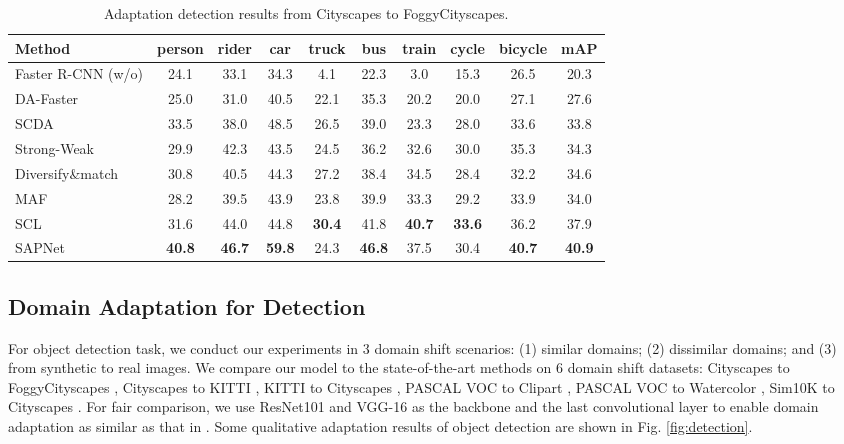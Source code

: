 \documentclass[runningheads]{llncs}
\begin{document}
\begin{table*}[t]
\centering
\caption{Adaptation detection results from Cityscapes to FoggyCityscapes.}
\setlength{\tabcolsep}{2.5pt}
\begin{tabular}{l|cccccccc|c}
\hline
Method  &person &rider &car &truck &bus &train &cycle &bicycle &mAP \\
\hline
Faster R-CNN (w/o)     & 24.1& 33.1& 34.3& 4.1 & 22.3& 3.0 & 15.3& 26.5&  20.3 \\
DA-Faster \cite{DBLP:conf/cvpr/Chen0SDG18}& 25.0& 31.0& 40.5& 22.1& 35.3& 20.2& 20.0& 27.1&  27.6 \\
SCDA \cite{DBLP:conf/cvpr/ZhuPYSL19}&33.5 & 38.0 & 48.5 &26.5 &39.0 &23.3 &28.0 &33.6 &33.8 \\
Strong-Weak \cite{DBLP:conf/cvpr/SaitoUHS19} & 29.9& 42.3& 43.5& 24.5& 36.2& 32.6& 30.0& 35.3&  34.3 \\
Diversify\&match \cite{DBLP:conf/cvpr/KimJKCK19}& 30.8& 40.5& 44.3& 27.2& 38.4& 34.5& 28.4& 32.2&  34.6 \\
MAF \cite{DBLP:journals/corr/abs-1907-10343}         & 28.2& 39.5& 43.9& 23.8& 39.9& 33.3& 29.2& 33.9& 34.0\\
SCL \cite{DBLP:journals/corr/abs-1911-02559}         & 31.6& 44.0& 44.8& {\bf 30.4}& 41.8& {\bf 40.7}& {\bf 33.6}& 36.2&  37.9 \\
\hline
SAPNet                          &{\bf 40.8} &{\bf 46.7} &{\bf 59.8} &24.3 &{\bf 46.8} &37.5 &30.4 &{\bf 40.7} &{\bf 40.9} \\
\hline
\end{tabular}
\label{tab:city2foggy}
\end{table*}

\subsection{Domain Adaptation for Detection}
For object detection task, we conduct our experiments in $3$ domain shift scenarios: (1) similar domains; (2) dissimilar domains; and (3) from synthetic to real images. We compare our model to the state-of-the-art methods on $6$ domain shift datasets: Cityscapes \cite{DBLP:conf/cvpr/CordtsORREBFRS16} to FoggyCityscapes \cite{DBLP:journals/ijcv/SakaridisDG18}, Cityscapes \cite{DBLP:conf/cvpr/CordtsORREBFRS16} to KITTI \cite{DBLP:conf/cvpr/GeigerLU12}, KITTI \cite{DBLP:conf/cvpr/GeigerLU12} to Cityscapes \cite{DBLP:conf/cvpr/CordtsORREBFRS16}, PASCAL VOC \cite{DBLP:journals/ijcv/EveringhamGWWZ10} to Clipart \cite{DBLP:conf/cvpr/InoueFYA18}, PASCAL VOC \cite{DBLP:journals/ijcv/EveringhamGWWZ10} to Watercolor \cite{DBLP:conf/cvpr/InoueFYA18}, Sim10K \cite{DBLP:conf/icra/Johnson-Roberson17} to Cityscapes \cite{DBLP:conf/cvpr/CordtsORREBFRS16}. For fair comparison, we use ResNet101 and VGG-16 as the backbone and the last convolutional layer to enable domain adaptation as similar as that in \cite{DBLP:conf/cvpr/SaitoUHS19,DBLP:journals/corr/abs-1911-02559}. Some qualitative adaptation results of object detection are shown in Fig. \ref{fig:detection}.
\end{document}
